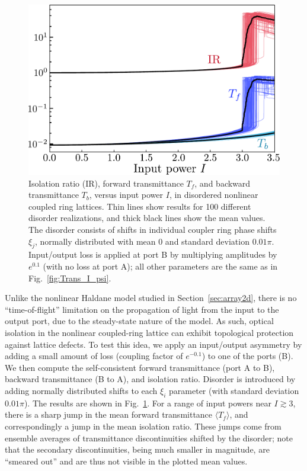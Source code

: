 \documentclass[aps,prx,twocolumn,superscriptaddress]{revtex4-1}
\begin{document}
\begin{figure}
  \centering
  \includegraphics[width=0.8\linewidth]{fig_wy/IRP2.pdf}
  \caption{Isolation ratio (IR), forward transmittance $T_f$, and backward transmittance $T_b$, versus input power $I$, in disordered nonlinear coupled ring lattices.  Thin lines show results for 100 different disorder realizations, and thick black lines show the mean values.  The disorder consists of shifts in individual coupler ring phase shifts $\xi_j$, normally distributed with mean 0 and standard deviation $0.01\pi$.  Input/output loss is applied at port B by multiplying amplitudes by $e^{0.1}$ (with no loss at port A); all other parameters are the same as in Fig.~\ref{fig:Trans_I_psi}.}
  \label{fig:IRP}
\end{figure}

Unlike the nonlinear Haldane model studied in Section~\ref{sec:array2d}, there is no ``time-of-flight'' limitation on the propagation of light from the input to the output port, due to the steady-state nature of the model.  As such, optical isolation in the nonlinear coupled-ring lattice can exhibit topological protection against lattice defects.  To test this idea, we apply an input/output asymmetry by adding a small amount of loss (coupling factor of $e^{-0.1}$) to one of the ports (B).  We then compute the self-consistent forward transmittance (port A to B), backward transmittance (B to A), and isolation ratio.  Disorder is introduced by adding normally distributed shifts to each $\xi_i$ parameter (with standard deviation $0.01\pi$).  The results are shown in Fig.~\ref{fig:IRP}.  For a range of input powers near $I \gtrsim 3$, there is a sharp jump in the mean forward transmittance $\langle T_f\rangle$, and correspondingly a jump in the mean isolation ratio.  These jumps come from ensemble averages of transmittance discontinuities shifted by the disorder; note that the secondary discontinuities, being much smaller in magnitude, are ``smeared out'' and are thus not visible in the plotted mean values.
\end{document}
